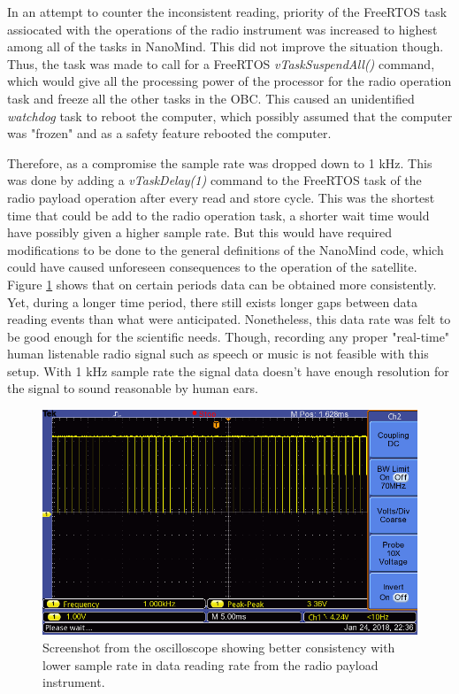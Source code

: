 \documentclass[english,12pt,a4paper,pdftex,elec,utf8]{aaltothesis}
\begin{document}
In an attempt to counter the inconsistent reading, priority of the FreeRTOS task assiocated with the operations of the radio instrument was increased to highest among all of the tasks in NanoMind. This did not improve the situation though. Thus, the task was made to call for a FreeRTOS \textit{vTaskSuspendAll()} command, which would give all the processing power of the processor for the radio operation task and freeze all the other tasks in the OBC. This caused an unidentified \textit{watchdog} task to reboot the computer, which possibly assumed that the computer was "frozen" and as a safety feature rebooted the computer.\par
Therefore, as a compromise the sample rate was dropped down to 1 kHz. This was done by adding a \textit{vTaskDelay(1)} command to the FreeRTOS task of the radio payload operation after every read and store cycle. This was the shortest time that could be add to the radio operation task, a shorter wait time would have possibly given a higher sample rate. But this would have required modifications to be done to the general definitions of the NanoMind code, which could have caused unforeseen consequences to the operation of the satellite. Figure \ref{payloadosc2} shows that on certain periods data can be obtained more consistently. Yet, during a longer time period, there still exists longer gaps between data reading events than what were anticipated. Nonetheless, this data rate was felt to be good enough for the scientific needs. Though, recording any proper "real-time" human listenable radio signal such as speech or music is not feasible with this setup. With 1 kHz sample rate the signal data doesn't have enough resolution for the signal to sound reasonable by human ears. \par
\begin{figure}[h!]
\centering
\includegraphics[scale=0.5]{F0003TEK}
\caption{Screenshot from the oscilloscope showing better consistency with lower sample rate in data reading rate from the radio payload instrument.}
\label{payloadosc2}
\end{figure}
\end{document}
